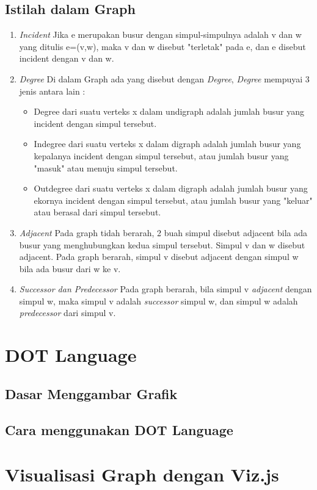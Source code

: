 \subsection{Istilah dalam Graph}
\label{sec: Istilah dalam Graph}
\begin{enumerate}
\item \textit{Incident}
Jika e merupakan busur dengan simpul-simpulnya adalah v dan w yang
ditulis e=(v,w), maka v dan w disebut "terletak" pada e, dan e disebut incident
dengan v dan w.
\item \textit{Degree}
Di dalam Graph ada yang disebut dengan \textit{Degree}, \textit{Degree} mempuyai 3 jenis antara lain :
\begin{itemize}
\item Degree dari suatu verteks x dalam undigraph adalah jumlah busur yang
incident dengan simpul tersebut.
\item Indegree dari suatu verteks x dalam digraph adalah jumlah busur yang
kepalanya incident dengan simpul tersebut, atau jumlah busur yang "masuk" atau menuju simpul tersebut.
\item Outdegree dari suatu verteks x dalam digraph adalah jumlah busur yang
ekornya incident dengan simpul tersebut, atau jumlah busur yang "keluar"
atau berasal dari simpul tersebut.
\end{itemize}
\item \textit{Adjacent}
Pada graph tidah berarah, 2 buah simpul disebut adjacent bila ada busur yang
menghubungkan kedua simpul tersebut. Simpul v dan w disebut adjacent. 
Pada graph berarah, simpul v disebut adjacent dengan simpul w bila ada busur
dari w ke v.
\item \textit{Successor dan Predecessor}
Pada graph berarah, bila simpul v \textit{adjacent} dengan simpul w, maka simpul v adalah \textit{successor} simpul w, dan simpul w adalah \textit{predecessor} dari simpul v.
\end{enumerate}

\section{DOT Language}
\label{secl : DOT Language}

\subsection{Dasar Menggambar Grafik}
\label{sec: Dasar Menggambar Grafik}


\subsection{Cara menggunakan DOT Language}
\label{sec: Cara menggunakan DOT Language}


\section{Visualisasi Graph dengan Viz.js}
\label{sec: Visualisasi Graph dengan Viz.js}

